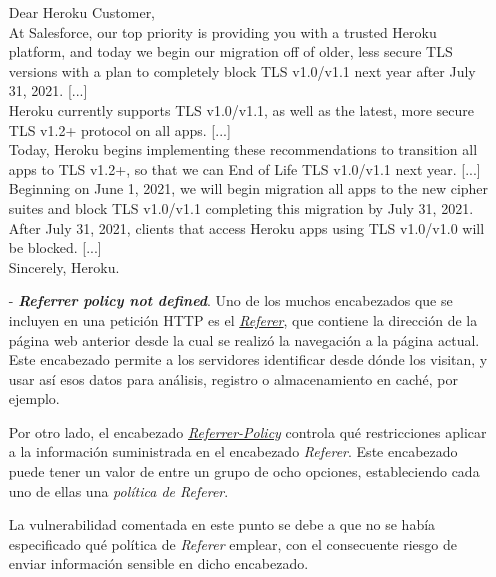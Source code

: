 \documentclass[a4paper]{article}
\begin{document}
\begin{itemize}
		\begin{displayquote}
			Dear Heroku Customer,
			\\
			
			At Salesforce, our top priority is providing you with a trusted Heroku platform, and today we begin our migration off of older, less secure TLS versions with a plan to completely block TLS v1.0/v1.1 next year after July 31, 2021. [...]
			\\
			
			Heroku currently supports TLS v1.0/v1.1, as well as the latest, more secure TLS v1.2+ protocol on all apps. [...]
			\\
			
			Today, Heroku begins implementing these recommendations to transition all apps to TLS v1.2+, so that we can End of Life TLS v1.0/v1.1 next year. [...]
			\\
			
			Beginning on June 1, 2021, we will begin migration all apps to the new cipher suites and block TLS v1.0/v1.1 completing this migration by July 31, 2021. 
			\\
			
			After July 31, 2021, clients that access Heroku apps using TLS v1.0/v1.0 will be blocked. [...]
			\\
			
			Sincerely, Heroku.
		\end{displayquote}
		
		\item[-] \textbf{\emph{Referrer policy not defined}}. Uno de los muchos encabezados que se incluyen en una petición HTTP es el \href{https://developer.mozilla.org/en-US/docs/Web/HTTP/Headers/Referer}{\emph{Referer}}, que contiene la dirección de la página web anterior desde la cual se realizó la navegación a la página actual. Este encabezado permite a los servidores identificar desde dónde los visitan, y usar así esos datos para análisis, registro o almacenamiento en caché, por ejemplo.
		
		Por otro lado, el encabezado \href{https://developer.mozilla.org/en-US/docs/Web/HTTP/Headers/Referrer-Policy}{\emph{Referrer-Policy}} controla qué restricciones aplicar a la información suministrada en el encabezado \emph{Referer}. Este encabezado puede tener un valor de entre un grupo de ocho opciones, estableciendo cada uno de ellas una \emph{política de Referer}.
		
		La vulnerabilidad comentada en este punto se debe a que no se había especificado qué política de \emph{Referer} emplear, con el consecuente riesgo de enviar información sensible en dicho encabezado.
		

\end{itemize}
\end{document}
